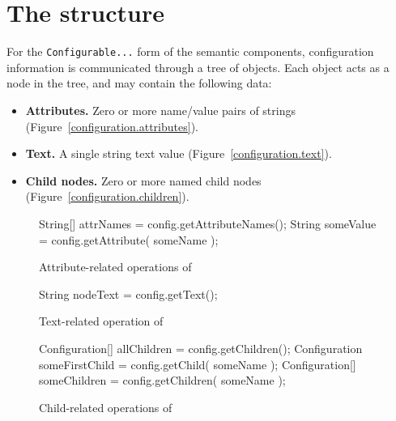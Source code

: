 \section{The  structure}

For the \texttt{Configurable...} form of the semantic components, 
configuration information is communicated through a tree of
 objects.  Each 
object acts as a node in the tree, and may contain the following
data:

\begin{itemize}
  \item \textbf{Attributes.} Zero or more name/value pairs of strings
(Figure~\vref{configuration.attributes}).
  \item \textbf{Text.} A single string text value
(Figure~\vref{configuration.text}).
  \item \textbf{Child  nodes.} Zero or more named
    child  nodes
(Figure~\vref{configuration.children}).
\end{itemize}

\begin{figure}
\begin{javaCodelisting}
String[] attrNames = config.getAttributeNames();
String   someValue = config.getAttribute( someName );
\end{javaCodelisting}
\caption{Attribute-related operations of }
\label{configuration.attributes}
\end{figure}

\begin{figure}
\begin{javaCodelisting}
String nodeText = config.getText();
\end{javaCodelisting}
\caption{Text-related operation of }
\label{configuration.text}
\end{figure}

\begin{figure}
\begin{javaCodelisting}
Configuration[] allChildren    = config.getChildren();
Configuration   someFirstChild = config.getChild( someName );
Configuration[] someChildren   = config.getChildren( someName );
\end{javaCodelisting}
\caption{Child-related operations of }
\label{configuration.children}
\end{figure}

